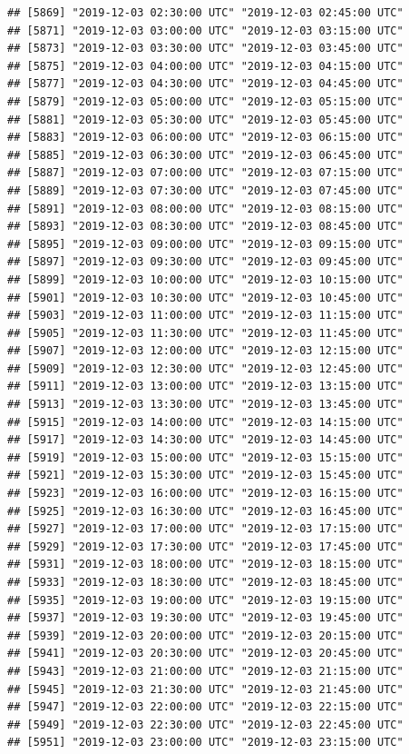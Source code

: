 \documentclass{article}\usepackage[]{graphicx}\usepackage[]{color}
\makeatletter
\newenvironment{kframe}{%
 \def\at@end@of@kframe{}%
 \ifinner\ifhmode%
  \def\at@end@of@kframe{\end{minipage}}%
  \begin{minipage}{\columnwidth}%
 \fi\fi%
 \def\FrameCommand##1{\hskip\@totalleftmargin \hskip-\fboxsep
 \colorbox{shadecolor}{##1}\hskip-\fboxsep
     \hskip-\linewidth \hskip-\@totalleftmargin \hskip\columnwidth}%
 \MakeFramed {\advance\hsize-\width
   \@totalleftmargin\z@ \linewidth\hsize
   \@setminipage}}%
 {\par\unskip\endMakeFramed%
 \at@end@of@kframe}
\newenvironment{knitrout}{}{} %
\makeatother
\begin{document}
\begin{knitrout}
\begin{kframe}
\begin{verbatim}
## [5869] "2019-12-03 02:30:00 UTC" "2019-12-03 02:45:00 UTC"
## [5871] "2019-12-03 03:00:00 UTC" "2019-12-03 03:15:00 UTC"
## [5873] "2019-12-03 03:30:00 UTC" "2019-12-03 03:45:00 UTC"
## [5875] "2019-12-03 04:00:00 UTC" "2019-12-03 04:15:00 UTC"
## [5877] "2019-12-03 04:30:00 UTC" "2019-12-03 04:45:00 UTC"
## [5879] "2019-12-03 05:00:00 UTC" "2019-12-03 05:15:00 UTC"
## [5881] "2019-12-03 05:30:00 UTC" "2019-12-03 05:45:00 UTC"
## [5883] "2019-12-03 06:00:00 UTC" "2019-12-03 06:15:00 UTC"
## [5885] "2019-12-03 06:30:00 UTC" "2019-12-03 06:45:00 UTC"
## [5887] "2019-12-03 07:00:00 UTC" "2019-12-03 07:15:00 UTC"
## [5889] "2019-12-03 07:30:00 UTC" "2019-12-03 07:45:00 UTC"
## [5891] "2019-12-03 08:00:00 UTC" "2019-12-03 08:15:00 UTC"
## [5893] "2019-12-03 08:30:00 UTC" "2019-12-03 08:45:00 UTC"
## [5895] "2019-12-03 09:00:00 UTC" "2019-12-03 09:15:00 UTC"
## [5897] "2019-12-03 09:30:00 UTC" "2019-12-03 09:45:00 UTC"
## [5899] "2019-12-03 10:00:00 UTC" "2019-12-03 10:15:00 UTC"
## [5901] "2019-12-03 10:30:00 UTC" "2019-12-03 10:45:00 UTC"
## [5903] "2019-12-03 11:00:00 UTC" "2019-12-03 11:15:00 UTC"
## [5905] "2019-12-03 11:30:00 UTC" "2019-12-03 11:45:00 UTC"
## [5907] "2019-12-03 12:00:00 UTC" "2019-12-03 12:15:00 UTC"
## [5909] "2019-12-03 12:30:00 UTC" "2019-12-03 12:45:00 UTC"
## [5911] "2019-12-03 13:00:00 UTC" "2019-12-03 13:15:00 UTC"
## [5913] "2019-12-03 13:30:00 UTC" "2019-12-03 13:45:00 UTC"
## [5915] "2019-12-03 14:00:00 UTC" "2019-12-03 14:15:00 UTC"
## [5917] "2019-12-03 14:30:00 UTC" "2019-12-03 14:45:00 UTC"
## [5919] "2019-12-03 15:00:00 UTC" "2019-12-03 15:15:00 UTC"
## [5921] "2019-12-03 15:30:00 UTC" "2019-12-03 15:45:00 UTC"
## [5923] "2019-12-03 16:00:00 UTC" "2019-12-03 16:15:00 UTC"
## [5925] "2019-12-03 16:30:00 UTC" "2019-12-03 16:45:00 UTC"
## [5927] "2019-12-03 17:00:00 UTC" "2019-12-03 17:15:00 UTC"
## [5929] "2019-12-03 17:30:00 UTC" "2019-12-03 17:45:00 UTC"
## [5931] "2019-12-03 18:00:00 UTC" "2019-12-03 18:15:00 UTC"
## [5933] "2019-12-03 18:30:00 UTC" "2019-12-03 18:45:00 UTC"
## [5935] "2019-12-03 19:00:00 UTC" "2019-12-03 19:15:00 UTC"
## [5937] "2019-12-03 19:30:00 UTC" "2019-12-03 19:45:00 UTC"
## [5939] "2019-12-03 20:00:00 UTC" "2019-12-03 20:15:00 UTC"
## [5941] "2019-12-03 20:30:00 UTC" "2019-12-03 20:45:00 UTC"
## [5943] "2019-12-03 21:00:00 UTC" "2019-12-03 21:15:00 UTC"
## [5945] "2019-12-03 21:30:00 UTC" "2019-12-03 21:45:00 UTC"
## [5947] "2019-12-03 22:00:00 UTC" "2019-12-03 22:15:00 UTC"
## [5949] "2019-12-03 22:30:00 UTC" "2019-12-03 22:45:00 UTC"
## [5951] "2019-12-03 23:00:00 UTC" "2019-12-03 23:15:00 UTC"

\end{verbatim}
\end{kframe}
\end{knitrout}
\end{document}

